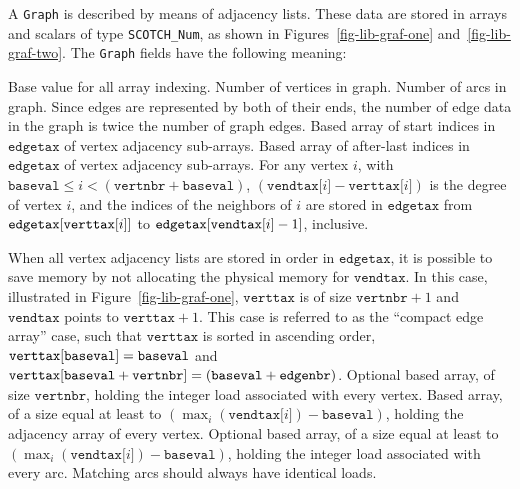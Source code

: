 A \texttt{Graph} is described by means of adjacency lists. These data
are stored in arrays and scalars of type \texttt{SCOTCH\_Num}, as
shown in Figures~\ref{fig-lib-graf-one}
and~\ref{fig-lib-graf-two}. The \texttt{Graph} fields have the
following meaning:
\begin{itemize}
Base value for all array indexing.
Number of vertices in graph.
Number of arcs in graph. Since edges are represented by both of their
ends, the number of edge data in the graph is twice the number of
graph edges.
Based array of start indices in $\mathtt{edgetax}$ of vertex
adjacency sub-arrays.
Based array of after-last indices in $\mathtt{edgetax}$ of vertex
adjacency sub-arrays.
For any vertex $i$, with $\mathtt{baseval} \leq i < (\mathtt{vertnbr}
+ \mathtt{baseval})$, $(\mathtt{vendtax[}i\mathtt{]}
-\mathtt{verttax[}i\mathtt{]})$ is the degree of vertex $i$, and the
indices of the neighbors of $i$ are stored in $\mathtt{edgetax}$ from
$\mathtt{edgetax[\lbt verttax[}i\mathtt{]]}$ to $\mathtt{edgetax[\lbt
vendtax[}i\mathtt{]} - 1\mathtt{]}$, inclusive.

When all vertex adjacency lists are stored in order in
$\mathtt{edgetax}$, it is possible to save memory by not allocating
the physical memory for $\mathtt{vendtax}$. In this case, illustrated
in Figure~\ref{fig-lib-graf-one}, $\mathtt{verttax}$ is of size
$\mathtt{vertnbr} + 1$ and $\mathtt{vendtax}$ points to
$\mathtt{verttax} + 1$. This case is referred to as the ``compact edge
array'' case, such that $\mathtt{verttax}$ is sorted in ascending
order, $\mathtt{verttax[\lbt baseval]} = \mathtt{baseval}$ and
$\mathtt{verttax[\lbt baseval} + \mathtt{vertnbr]} =
(\mathtt{baseval} + \mathtt{edgenbr})$.
Optional based array, of size $\mathtt{vertnbr}$, holding the integer
load associated with every vertex.
Based array, of a size equal at least to
$\left(\max_{i}(\mathtt{vendtax[}i\mathtt{]}) -
\mathtt{baseval}\right)$, holding the adjacency array of every
vertex.
Optional based array, of a size equal at least to
$\left(\max_{i}(\mathtt{vendtax[} i \mathtt{]}) -
\mathtt{baseval}\right)$, holding the integer load associated with
every arc. Matching arcs should always have identical loads.
\end{itemize}

